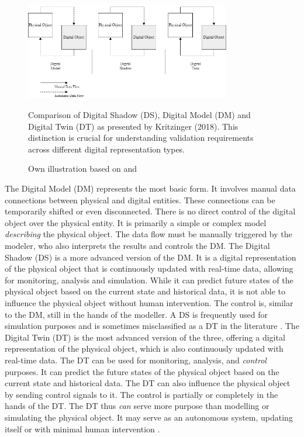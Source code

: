 \begin{figure}[htbp]
  \centering
  \includegraphics[width=0.8\textwidth]{figures/kritzinger.png}
  \caption[The different types of digital models.]{Comparison of Digital Shadow (DS), Digital Model (DM) and Digital Twin (DT) as presented by Kritzinger (2018). This distinction is crucial for understanding validation requirements across different digital representation types.}
  \label{fig:Kritzinger}
  \caption*{Own illustration based on \textcite{kritzinger2018digital} and \textcite{Zhang2021jmsy}}
\end{figure}

The Digital Model (DM) represents the most basic form. It involves manual data connections between physical and digital entities. These connections can be temporarily shifted or even disconnected. There is no direct control of the digital object over the physical entity. It is primarily a simple or complex model \textit{describing} the physical object. The data flow must be manually triggered by the modeler, who also interprets the results and controls the DM.
The Digital Shadow (DS) is a more advanced version of the DM. It is a digital representation of the physical object that is continuously updated with real-time data, allowing for monitoring, analysis and simulation. While it can predict future states of the physical object based on the current state and historical data, it is not able to influence the physical object without human intervention. The control is, similar to the DM, still in the hands of the modeller. A DS is frequently used for simulation purposes and is sometimes misclassified as a DT in the literature \autocite{kritzinger2018digital,sepasgozar2021differentiating}.
The Digital Twin (DT) is the most advanced version of the three, offering a digital representation of the physical object, which is also continuously updated with real-time data. The DT can be used for monitoring, analysis, and \textit{control} purposes. It can predict the future states of the physical object based on the current state and historical data. The DT can also influence the physical object by sending control signals to it. The control is partially or completely in the hands of the DT. The DT thus \textit{can} serve more purpose than modelling or simulating the physical object. It may serve as an autonomous system, updating itself or with minimal human intervention \autocite{kritzinger2018digital}.

